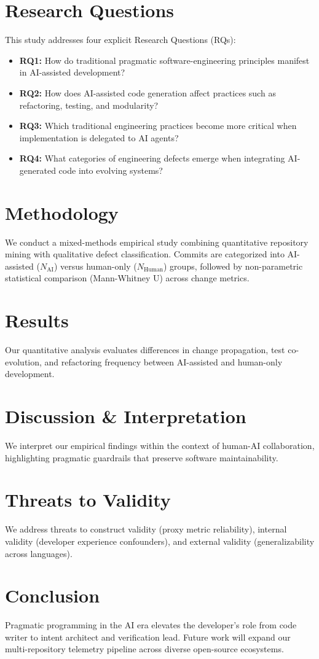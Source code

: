 \documentclass[10pt,twocolumn,a4paper]{article}
\begin{document}
\section{Research Questions}
This study addresses four explicit Research Questions (RQs):
\begin{itemize}
    \item \textbf{RQ1:} How do traditional pragmatic software-engineering principles manifest in AI-assisted development?
    \item \textbf{RQ2:} How does AI-assisted code generation affect practices such as refactoring, testing, and modularity?
    \item \textbf{RQ3:} Which traditional engineering practices become more critical when implementation is delegated to AI agents?
    \item \textbf{RQ4:} What categories of engineering defects emerge when integrating AI-generated code into evolving systems?
\end{itemize}

\section{Methodology}
We conduct a mixed-methods empirical study combining quantitative repository mining with qualitative defect classification. Commits are categorized into AI-assisted ($N_{\text{AI}}$) versus human-only ($N_{\text{Human}}$) groups, followed by non-parametric statistical comparison (Mann-Whitney U) across change metrics.

\section{Results}
Our quantitative analysis evaluates differences in change propagation, test co-evolution, and refactoring frequency between AI-assisted and human-only development.

\section{Discussion \& Interpretation}
We interpret our empirical findings within the context of human-AI collaboration, highlighting pragmatic guardrails that preserve software maintainability.

\section{Threats to Validity}
We address threats to construct validity (proxy metric reliability), internal validity (developer experience confounders), and external validity (generalizability across languages).

\section{Conclusion}
Pragmatic programming in the AI era elevates the developer's role from code writer to intent architect and verification lead. Future work will expand our multi-repository telemetry pipeline across diverse open-source ecosystems.



\end{document}
